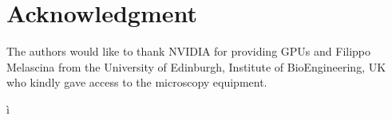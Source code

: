 \documentclass[conference]{IEEEtran}
\begin{document}
%



\section*{Acknowledgment}
The authors would like to thank NVIDIA for providing GPUs and Filippo Melascina from the University of Edinburgh, Institute of BioEngineering, UK who kindly gave access to the microscopy equipment.


\ifCLASSOPTIONcaptionsoff
  \newpage
\fi



 ì%

\end{document}
